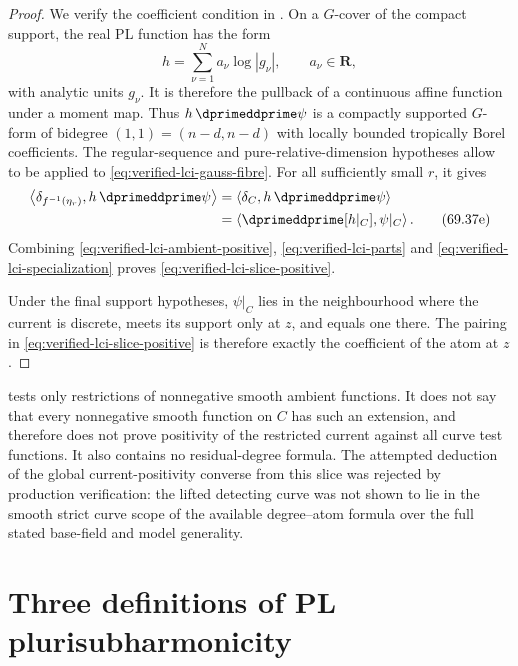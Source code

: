 \begin{proof}
We verify the coefficient condition in
\cite[Proposition~18.7.3]{CLD25}.  On a \(G\)-cover of the compact support,
the real PL function has the form
\[
                         h=\sum_{\nu=1}^N a_\nu\log|g_\nu|,
             \qquad a_\nu\in\mathbf R,
\]
with analytic units \(g_\nu\).  It is therefore the pullback of a continuous
affine function under a moment map.  Thus
\(h\,\dprimeddprime\psi\) is a compactly supported \(G\)-form of bidegree
\((1,1)=(n-d,n-d)\) with locally bounded tropically Borel coefficients.
The regular-sequence and pure-relative-dimension hypotheses allow
\cite[Proposition~18.7.3]{CLD25} to be applied to
\eqref{eq:verified-lci-gauss-fibre}.  For all sufficiently small \(r\),
it gives
\begin{align}
 \left\langle
       \delta_{f^{-1}(\eta_r)},h\,\dprimeddprime\psi
 \right\rangle
 &=\left\langle\delta_C,h\,\dprimeddprime\psi\right\rangle\notag\\
 &=\left\langle\dprimeddprime[h|_C],\psi|_C\right\rangle.
\tag{69.37e}\label{eq:verified-lci-specialization}
\end{align}
Combining \eqref{eq:verified-lci-ambient-positive},
\eqref{eq:verified-lci-parts} and
\eqref{eq:verified-lci-specialization} proves
\eqref{eq:verified-lci-slice-positive}.

Under the final support hypotheses, \(\psi|_C\) lies in the neighbourhood
where the current is discrete, meets its support only at \(z\), and equals
one there.  The pairing in \eqref{eq:verified-lci-slice-positive} is
therefore exactly the coefficient of the atom at \(z\).
\end{proof}

\begin{remark}
\label{rem:verified-lci-slice-scope}
 tests only restrictions of
nonnegative smooth ambient functions.  It does not say that every
nonnegative smooth function on $C$ has such an extension, and therefore
does not prove positivity of the restricted current against all curve test
functions.  It also contains no residual-degree formula.  The attempted
deduction of the global current-positivity converse from this slice was
rejected by production verification: the lifted detecting curve was not
shown to lie in the smooth strict curve scope of the available
degree--atom formula over the full stated base-field and model generality.
\end{remark}

\section{Three definitions of PL plurisubharmonicity}
\label{sec:verified-pl-psh-equivalence}

